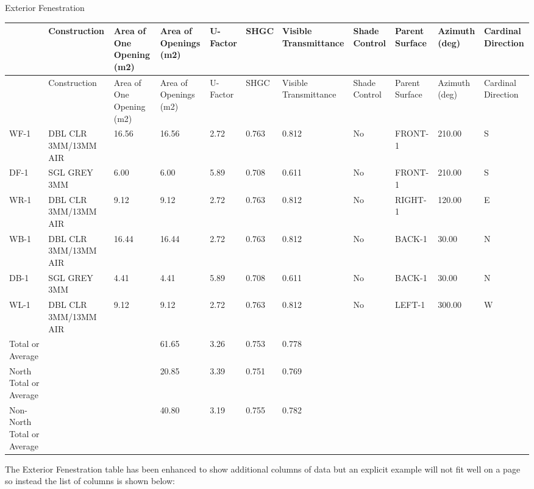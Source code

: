 Exterior Fenestration

{\scriptsize
\begin{longtable}[c]{>{\raggedright}p{0.5in}>{\raggedright}p{0.5in}>{\raggedright}p{0.5in}>{\raggedright}p{0.5in}>{\raggedright}p{0.5in}>{\raggedright}p{0.5in}>{\raggedright}p{0.5in}>{\raggedright}p{0.5in}>{\raggedright}p{0.5in}>{\raggedright}p{0.5in}>{\raggedright}p{0.5in}}
\toprule
~ & Construction & Area of One Opening (m2) & Area of Openings (m2) & U-Factor & SHGC & Visible Transmittance & Shade Control & Parent Surface & Azimuth (deg) & Cardinal Direction \tabularnewline
\midrule
\endfirsthead

\toprule
~ & Construction & Area of One Opening (m2) & Area of Openings (m2) & U-Factor & SHGC & Visible Transmittance & Shade Control & Parent Surface & Azimuth (deg) & Cardinal Direction \tabularnewline
\midrule
\endhead

WF-1 & DBL CLR 3MM/13MM AIR & 16.56 & 16.56 & 2.72 & 0.763 & 0.812 & No & FRONT-1 & 210.00 & S \tabularnewline
DF-1 & SGL GREY 3MM & 6.00 & 6.00 & 5.89 & 0.708 & 0.611 & No & FRONT-1 & 210.00 & S \tabularnewline
WR-1 & DBL CLR 3MM/13MM AIR & 9.12 & 9.12 & 2.72 & 0.763 & 0.812 & No & RIGHT-1 & 120.00 & E \tabularnewline
WB-1 & DBL CLR 3MM/13MM AIR & 16.44 & 16.44 & 2.72 & 0.763 & 0.812 & No & BACK-1 & 30.00 & N \tabularnewline
DB-1 & SGL GREY 3MM & 4.41 & 4.41 & 5.89 & 0.708 & 0.611 & No & BACK-1 & 30.00 & N \tabularnewline
WL-1 & DBL CLR 3MM/13MM AIR & 9.12 & 9.12 & 2.72 & 0.763 & 0.812 & No & LEFT-1 & 300.00 & W \tabularnewline
Total or Average & ~ & ~ & 61.65 & 3.26 & 0.753 & 0.778 & ~ & ~ & ~ & ~ \tabularnewline
North Total or Average & ~ & ~ & 20.85 & 3.39 & 0.751 & 0.769 & ~ & ~ & ~ & ~ \tabularnewline
Non-North Total or Average & ~ & ~ & 40.80 & 3.19 & 0.755 & 0.782 & ~ & ~ & ~ & ~ \tabularnewline
\bottomrule
\end{longtable}}

The Exterior Fenestration table has been enhanced to show additional columns of data but an explicit example will not fit well on a page so instead the list of columns is shown below:

